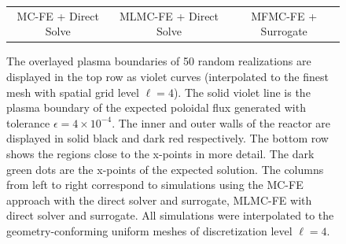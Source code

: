 \begin{figure}[ht!]
\begin{tabular}{ccc}
\\[1ex]
\quad MC-FE + Direct Solve &MLMC-FE + Direct Solve &MFMC-FE + Surrogate  \\[-0.5ex]
\end{tabular}
\caption{The overlayed plasma boundaries of 50 random realizations are 
displayed in the top row as violet curves (interpolated to the finest mesh with spatial grid level $\ell=4$). The solid violet line is the plasma boundary of the expected 
poloidal flux generated with tolerance $\epsilon=4\times 10^{-4}$. 
The inner and outer walls of the reactor are displayed in solid black and 
dark red respectively. The bottom row shows the regions close to the 
x-points in more detail. The dark green dots are the x-points of the expected 
solution. The columns from left to right correspond to simulations using the 
MC-FE approach with the direct solver and surrogate, MLMC-FE with direct 
solver and surrogate. All simulations were interpolated to the geometry-conforming uniform meshes of discretization level $\ell=4$.} 
\label{fig:QoI_plot}
\end{figure}


